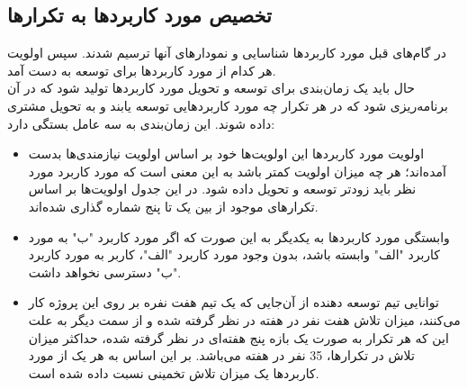 \documentclass[12pt]{article}
\begin{document}
	\subsection{تخصیص مورد کاربردها به تکرارها}
	در گام‌های قبل مورد کاربردها شناسایی و نمودارهای آنها ترسیم شدند. سپس اولویت هر کدام از مورد کاربردها برای توسعه به دست آمد.\\
	حال باید یک زمان‌بندی برای توسعه و تحویل مورد کاربردها تولید شود که در آن برنامه‌ریزی شود که در هر تکرار چه مورد کاربردهایی توسعه یابند و به تحویل مشتری داده شوند.
	این زمان‌بندی به سه عامل بستگی دارد:
	\begin{itemize}
		\item اولویت مورد کاربردها
		این اولویت‌ها خود بر اساس اولویت نیازمندی‌ها بدست آمده‌اند؛ هر چه میزان اولویت کمتر باشد به این معنی است که مورد کاربرد مورد نظر باید زودتر توسعه و تحویل داده شود. در این جدول اولویت‌ها بر اساس تکرارهای موجود از بین یک تا پنج شماره گذاری شده‌اند.
		\item وابستگی مورد کاربردها به یکدیگر
		به این صورت که اگر مورد کاربرد "ب" به مورد کاربرد "الف" وابسته باشد، بدون وجود مورد کاربرد "الف"، کاربر به مورد کاربرد "ب" دسترسی نخواهد داشت.
		\item توانایی تیم توسعه دهنده
		از آن‌جایی که یک تیم هفت نفره بر روی این پروژه کار می‌کنند، میزان تلاش هفت نفر در هفته در نظر گرفته شده و از سمت دیگر به علت این که هر تکرار به صورت یک بازه‌ پنج هفته‌ای در نظر گرفته شده، حداکثر میزان تلاش در تکرارها، 35 نفر در هفته می‌باشد. بر این اساس به هر یک از مورد کاربردها یک میزان تلاش تخمینی نسبت داده شده است.
	\end{itemize}
\end{document}
